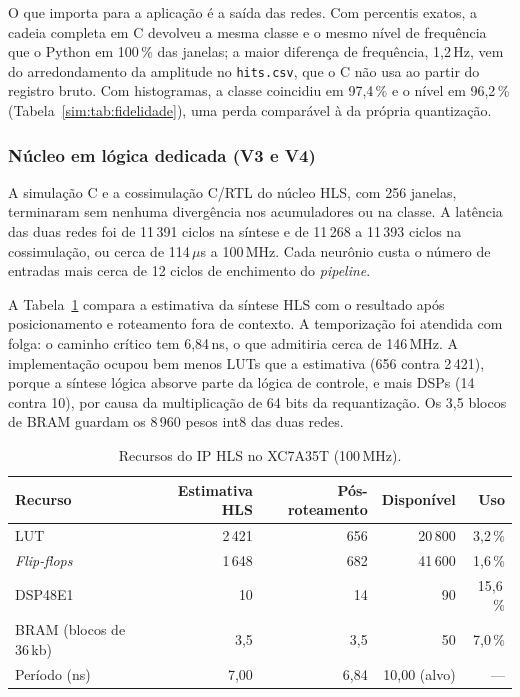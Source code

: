 O que importa para a aplicação é a saída das redes. Com percentis exatos, a cadeia completa em C devolveu a mesma classe e o mesmo nível de frequência que o Python em 100\,\% das janelas; a maior diferença de frequência, 1,2\,Hz, vem do arredondamento da amplitude no \texttt{hits.csv}, que o C não usa ao partir do registro bruto. Com histogramas, a classe coincidiu em 97,4\,\% e o nível em 96,2\,\% (Tabela~\ref{sim:tab:fidelidade}), uma perda comparável à da própria quantização.

\subsubsection{Núcleo em lógica dedicada (V3 e V4)}

A simulação C e a cossimulação C/RTL do núcleo HLS, com 256 janelas, terminaram sem nenhuma divergência nos acumuladores ou na classe. A latência das duas redes foi de 11\,391 ciclos na síntese e de 11\,268 a 11\,393 ciclos na cossimulação, ou cerca de 114\,\(\mu\)s a 100\,MHz. Cada neurônio custa o número de entradas mais cerca de 12 ciclos de enchimento do \textit{pipeline}.

A Tabela~\ref{sim:tab:recursos} compara a estimativa da síntese HLS com o resultado após posicionamento e roteamento fora de contexto. A temporização foi atendida com folga: o caminho crítico tem 6,84\,ns, o que admitiria cerca de 146\,MHz. A implementação ocupou bem menos LUTs que a estimativa (656 contra 2\,421), porque a síntese lógica absorve parte da lógica de controle, e mais DSPs (14 contra 10), por causa da multiplicação de 64 bits da requantização. Os 3,5 blocos de BRAM guardam os 8\,960 pesos int8 das duas redes.

\begin{table}[htbp]
	\centering
	\small
	\caption{Recursos do IP HLS no XC7A35T (100\,MHz).}
	\label{sim:tab:recursos}
	\begin{tabular}{lrrrr}
		\toprule
		\textbf{Recurso} & \textbf{Estimativa HLS} & \textbf{Pós-roteamento} & \textbf{Disponível} & \textbf{Uso} \\
		\midrule
		LUT & 2\,421 & 656 & 20\,800 & 3,2\,\% \\
		\textit{Flip-flops} & 1\,648 & 682 & 41\,600 & 1,6\,\% \\
		DSP48E1 & 10 & 14 & 90 & 15,6\,\% \\
		BRAM (blocos de 36\,kb) & 3,5 & 3,5 & 50 & 7,0\,\% \\
		Período (ns) & 7,00 & 6,84 & 10,00 (alvo) & --- \\
		\bottomrule
	\end{tabular}
\end{table}

